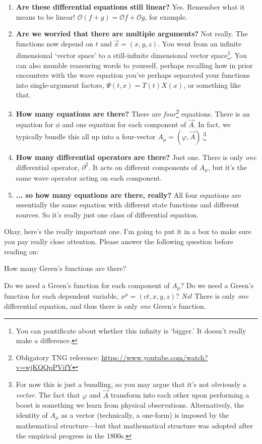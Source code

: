 \documentclass[
  11pt,
	colorful,
	raggedright,
]{tufte-style-thesis-flip}
\begin{document}
\begin{enumerate}
\item \textbf{Are these differential equations still linear?} Yes. Remember what it means to be linear! $\mathcal O(f+g) = \mathcal Of +\mathcal Og$, for example.
\item \textbf{Are we worried that there are multiple arguments?} Not really. The functions now depend on $t$ and $\vec{x}=(x,y,z)$. You went from an infinite dimensional `vector space' to a still-infinite dimensional vector space\footnote{You can pontificate about whether this infinity is `bigger.' It doesn't really make a difference.}. You can also mumble reassuring words to yourself, perhaps recalling how in prior encounters with the wave equation you've perhaps separated your functions into single-argument factors, $\Psi(t,x) = T(t)X(x)$, or something like that.
\item \textbf{How many equations are there?} There are \emph{four}\footnote{Obligatory TNG reference: \url{https://www.youtube.com/watch?v=wjKQQpPVifY}} equations. There is an equation for $\phi$ and one equation for each component of $\vec A$. In fact, we typically bundle this all up into a four-vector $A_\mu=(\varphi, \vec A)$.\footnote{For now this is just a bundling, so you may argue that it's not obviously a \emph{vector}. The fact that $\varphi$ and $\vec{A}$ transform into each other upon performing a boost is something we learn from physical observations. Alternatively, the identity of $A_\mu$ as a vector (technically, a one-form) is imposed by the mathematical structure---but that mathematical structure was adopted after the empirical progress in the 1800s.}
\item \textbf{How many differential operators are there?} Just one. There is only \emph{one} differential operator, $\partial^2$. It acts on different components of $A_\mu$, but it's the same wave operator acting on each component. 
\item \textbf{... so how many equations are there, really?} All four equations are essentially the same equation with different state functions and different sources. So it's really just one class of differential equation.
\end{enumerate}
Okay, here's the really important one. I'm going to put it in a box to make sure you pay really close attention. Please answer the following question before reading on:
\begin{framed}
\centering
How many Green's functions are there?
\end{framed}
Do we need a Green's function for each component of $A_\mu$? Do we need a Green's function for each dependent variable, $x^\mu = (ct,x,y,z)$? \emph{No}! There is only \emph{one} differential equation, and thus there is only \emph{one} Green's function. 
\end{document}
